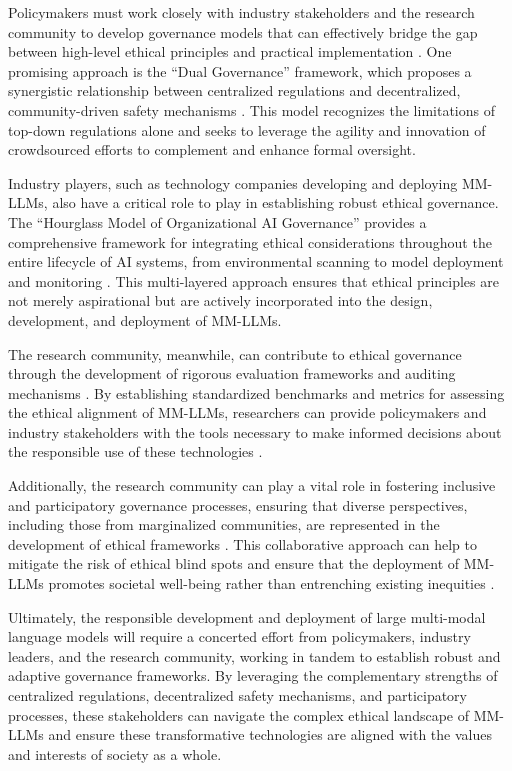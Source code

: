 \documentclass[11pt]{article}
\begin{document}
Policymakers must work closely with industry stakeholders and the research community to develop governance models that can effectively bridge the gap between high-level ethical principles and practical implementation \cite{ref279}. One promising approach is the ``Dual Governance'' framework, which proposes a synergistic relationship between centralized regulations and decentralized, community-driven safety mechanisms \cite{ref280}. This model recognizes the limitations of top-down regulations alone and seeks to leverage the agility and innovation of crowdsourced efforts to complement and enhance formal oversight.

Industry players, such as technology companies developing and deploying MM-LLMs, also have a critical role to play in establishing robust ethical governance. The ``Hourglass Model of Organizational AI Governance'' provides a comprehensive framework for integrating ethical considerations throughout the entire lifecycle of AI systems, from environmental scanning to model deployment and monitoring \cite{ref281}. This multi-layered approach ensures that ethical principles are not merely aspirational but are actively incorporated into the design, development, and deployment of MM-LLMs.

The research community, meanwhile, can contribute to ethical governance through the development of rigorous evaluation frameworks and auditing mechanisms \cite{ref282}. By establishing standardized benchmarks and metrics for assessing the ethical alignment of MM-LLMs, researchers can provide policymakers and industry stakeholders with the tools necessary to make informed decisions about the responsible use of these technologies \cite{ref233}.

Additionally, the research community can play a vital role in fostering inclusive and participatory governance processes, ensuring that diverse perspectives, including those from marginalized communities, are represented in the development of ethical frameworks \cite{ref279}. This collaborative approach can help to mitigate the risk of ethical blind spots and ensure that the deployment of MM-LLMs promotes societal well-being rather than entrenching existing inequities \cite{ref283}.

Ultimately, the responsible development and deployment of large multi-modal language models will require a concerted effort from policymakers, industry leaders, and the research community, working in tandem to establish robust and adaptive governance frameworks. By leveraging the complementary strengths of centralized regulations, decentralized safety mechanisms, and participatory processes, these stakeholders can navigate the complex ethical landscape of MM-LLMs and ensure these transformative technologies are aligned with the values and interests of society as a whole.
\end{document}

